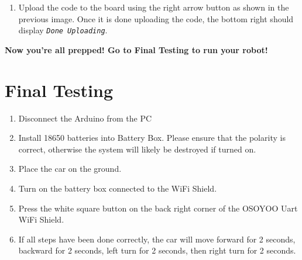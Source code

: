 \documentclass{article}
\begin{document}
\begin{enumerate}
		
		\item Upload the code to the board using the right arrow button as shown in the previous image. Once it is done uploading the code, the bottom right should display \texttt{\textit{Done Uploading}}.
		
	\end{enumerate}
	\textbf{Now you’re all prepped! Go to Final Testing to run your robot! }
	
	\section{Final Testing}
	
	\begin{enumerate}
		\item Disconnect the Arduino from the PC
		\item Install 18650 batteries into Battery Box. Please ensure that the polarity is correct, otherwise the system will likely be destroyed if turned on. 
		\item Place the car on the ground.
		\item Turn on the battery box connected to the WiFi Shield. 
		\item Press the white square button on the back right corner of the OSOYOO Uart WiFi Shield. 
		\item If all steps have been done correctly, the car will move forward for 2 seconds, backward for 2 seconds, left turn for 2 seconds, then right turn for 2 seconds.
		
	\end{enumerate}
	
\end{document}
